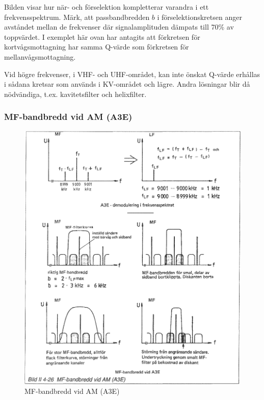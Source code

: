 Bilden visar hur när- och förselektion kompletterar varandra i ett
frekvensspektrum.  Märk, att passbandbredden \(b\) i
förselektionskretsen anger avståndet mellan de frekvenser där
signalamplituden dämpats till 70\% av toppvärdet. I exemplet här ovan
har antagits att förkretsen för kortvågsmottagning har samma Q-värde
som förkretsen för mellanvågsmottagning.

Vid högre frekvenser, i VHF- och UHF-området, kan inte önskat Q-värde
erhållas i sådana kretsar som används i KV-området och lägre. Andra
lösningar blir då nödvändiga, t.ex. kavitetsfilter och helixfilter.

\subsubsection{MF-bandbredd vid AM (A3E)}

\begin{figure}
  \includegraphics[width=\textwidth]{images/bild_2_4-26}
  \caption{MF-bandbredd vid AM (A3E)}
  \label{fig:bildII4-26}
\end{figure}

